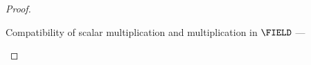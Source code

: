 \begin{proposition}
\begin{proof}
\begin{description}




    \item[Compatibility of scalar multiplication and multiplication in
      $\FIELD$ --- ]


\end{description}
\end{proof}
\end{proposition}
